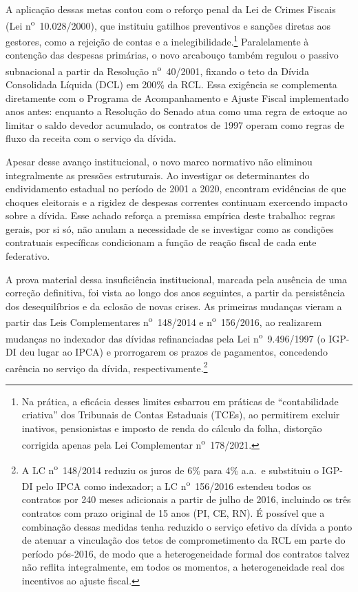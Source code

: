 A aplicação dessas metas contou com o reforço penal da Lei de Crimes Fiscais (Lei n\textsuperscript{o}~10.028/2000), que instituiu gatilhos preventivos e sanções diretas aos gestores, como a rejeição de contas e a inelegibilidade.\footnote{Na prática, a eficácia desses limites esbarrou em práticas de ``contabilidade criativa'' dos Tribunais de Contas Estaduais (TCEs), ao permitirem excluir inativos, pensionistas e imposto de renda do cálculo da folha, distorção corrigida apenas pela Lei Complementar n\textsuperscript{o}~178/2021.} Paralelamente à contenção das despesas primárias, o novo arcabouço também regulou o passivo subnacional a partir da Resolução n\textsuperscript{o}~40/2001, fixando o teto da Dívida Consolidada Líquida (DCL) em 200\% da RCL. Essa exigência se complementa diretamente com o Programa de Acompanhamento e Ajuste Fiscal implementado anos antes: enquanto a Resolução do Senado atua como uma regra de estoque ao limitar o saldo devedor acumulado, os contratos de 1997 operam como regras de fluxo da receita com o serviço da dívida.

Apesar desse avanço institucional, o novo marco normativo não eliminou integralmente as pressões estruturais. Ao investigar os determinantes do endividamento estadual no período de 2001 a 2020,  encontram evidências de que choques eleitorais e a rigidez de despesas correntes continuam exercendo impacto sobre a dívida. Esse achado reforça a premissa empírica deste trabalho: regras gerais, por si só, não anulam a necessidade de se investigar como as condições contratuais específicas condicionam a função de reação fiscal de cada ente federativo.

A prova material dessa insuficiência institucional, marcada pela ausência de uma correção definitiva, foi vista ao longo dos anos seguintes, a partir da persistência dos desequilíbrios e da eclosão de novas crises. As primeiras mudanças vieram a partir das Leis Complementares n\textsuperscript{o}~148/2014 e n\textsuperscript{o}~156/2016, ao realizarem mudanças no indexador das dívidas refinanciadas pela Lei n\textsuperscript{o}~9.496/1997 (o IGP-DI deu lugar ao IPCA) e prorrogarem os prazos de pagamentos, concedendo carência no serviço da dívida, respectivamente.\footnote{A LC n\textsuperscript{o}~148/2014 reduziu os juros de 6\% para 4\% a.a.\ e substituiu o IGP-DI pelo IPCA como indexador; a LC n\textsuperscript{o}~156/2016 estendeu todos os contratos por 240 meses adicionais a partir de julho de 2016, incluindo os três contratos com prazo original de 15 anos (PI, CE, RN). É possível que a combinação dessas medidas tenha reduzido o serviço efetivo da dívida a ponto de atenuar a vinculação dos tetos de comprometimento da RCL em parte do período pós-2016, de modo que a heterogeneidade formal dos contratos talvez não reflita integralmente, em todos os momentos, a heterogeneidade real dos incentivos ao ajuste fiscal.} 

